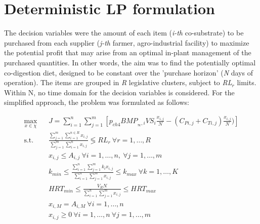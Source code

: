 \section{Deterministic LP formulation}
The decision variables were the amount of each item (\emph{i-th} co-substrate) to be purchased from each supplier (\emph{j-th} farmer, agro-industrial facility) to maximize the potential profit that may arise from an optimal in-plant management of the purchased quantities. In other words, the aim was to find the potentially optimal co-digestion diet, designed to be constant over the 'purchase horizon' (\emph{N} days of operation). The items are grouped in \emph{R} legislative clusters, subject to \emph{RL$_r$} limits.
Within N, no time domain for the decision variables is considered.
For the simplified approach, the problem was formulated as follows:

\begin{eqnarray*}
\max_{x\in\chi}&&J=\sum_{i=1}^{n}\sum_{j=1}^{m} [p_{ch4} BMP_{_\infty,i} VS_{i} \frac{x_{i,j}}{N} - (C_{Pi,j}+C_{Ti,j})\frac{x_{i,j}}{N})]\\
\mbox{s.t.} && \frac{\sum_{j=1}^{m}\sum_{i=1}^{n\in R} x_{i,j}}{\sum_{j=1}^{m}\sum_{i=1}^{n} x_{i,j}} \lessgtr RL_{r} \ \forall r=1,\dots,R\\
&& x_{i,j} \leq A_{i,j} \ \forall i=1,\dots,n,\ \forall j=1,\dots,m\\
&& k_{min}\leq \frac{\sum_{i=1}^{n}\sum_{j=1}^{m} k_i x_{i,j}}{\sum_{i=1}^{n}\sum_{j=1}^{m} x_{i,j}}\leq k_{max}\ \forall k=1,\dots,K\,\\
&& HRT_{min}\leq \frac{V_RN}{\sum_{i=1}^{n}\sum_{j=1}^{m} x_{i,j}}\leq HRT_{max}\\
&& x_{i,M} = A_{i,M}\ \forall i=1,\dots,n\\
&& x_{i,j}\geq 0\ \forall i=1,\dots,n\ \forall j=1,\dots,m\\
\end{eqnarray*}

